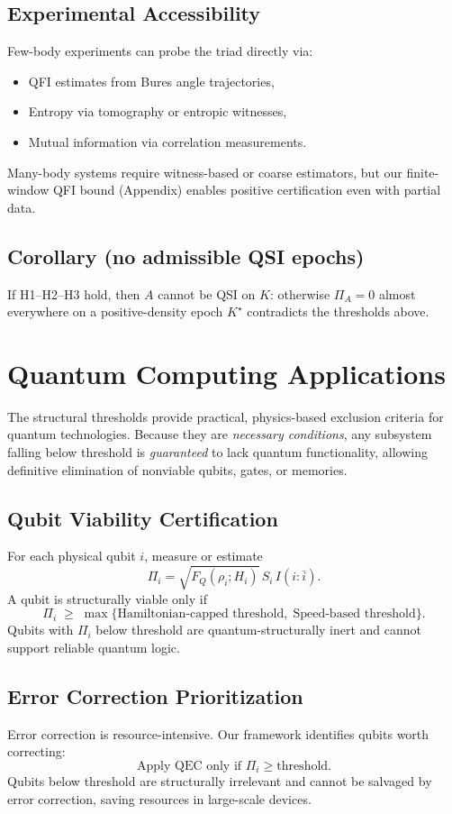 \documentclass[10pt]{article}
\begin{document}
\subsection{Experimental Accessibility}
Few-body experiments can probe the triad directly via:
\begin{itemize}
    \item QFI estimates from Bures angle trajectories,
    \item Entropy via tomography or entropic witnesses,
    \item Mutual information via correlation measurements.
\end{itemize}
Many-body systems require witness-based or coarse estimators, but our finite-window QFI bound
(Appendix) enables positive certification even with partial data.

\subsection*{Corollary (no admissible QSI epochs)}
If H1–H2–H3 hold, then $A$ cannot be QSI on $K$: otherwise $\Pi_A=0$ almost everywhere on a positive-density epoch $K^\star$ contradicts the thresholds above.

\section{Quantum Computing Applications}

The structural thresholds provide practical, physics-based exclusion criteria for quantum technologies.
Because they are \emph{necessary conditions}, any subsystem falling below threshold is
\emph{guaranteed} to lack quantum functionality, allowing definitive elimination of nonviable qubits,
gates, or memories.

\subsection{Qubit Viability Certification}
For each physical qubit $i$, measure or estimate
\begin{equation}
\Pi_i = \sqrt{F_Q(\rho_i;H_i)} \, S_i \, I(i:\bar{i}).
\end{equation}
\noindent
A qubit is structurally viable only if
\[
\Pi_i \;\geq\; \max\{\text{Hamiltonian-capped threshold},\;\text{Speed-based threshold}\}.
\]
Qubits with $\Pi_i$ below threshold are quantum-structurally inert and cannot support reliable
quantum logic.

\subsection{Error Correction Prioritization}
Error correction is resource-intensive. Our framework identifies qubits worth correcting:
\[
\text{Apply QEC only if } \Pi_i \geq \text{threshold}.
\]
Qubits below threshold are structurally irrelevant and cannot be salvaged by error correction,
saving resources in large-scale devices.
\end{document}
